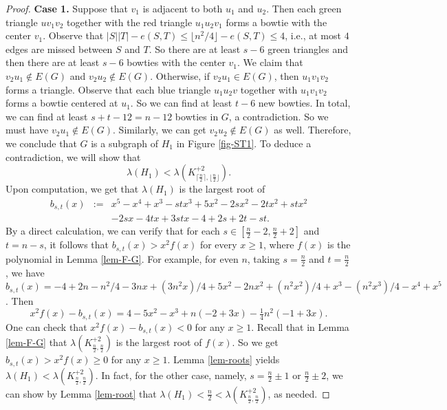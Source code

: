 \documentclass[11pt]{article}
\begin{document}
\begin{proof}
{\bf Case 1.} 
Suppose that 
$v_1$ is adjacent to both $u_1$ and $u_2$. 
Then each green triangle $uv_1v_2$ 
together with the red triangle $u_1u_2v_1$ 
forms a bowtie with the center $v_1$. 
Observe that $|S||T| - e(S,T) 
\le \lfloor n^2/4\rfloor - e(S,T)\le 4$, i.e., 
 at most $4$ edges are missed between 
$S$ and $T$. 
So there are at least $s-6$ green triangles and 
then there are at least $s-6$ bowties with the center 
$v_1$. 
We claim that $v_2u_1\notin E(G)$ and 
$v_2u_2\notin E(G)$. 
Otherwise, if $v_2u_1\in E(G)$, then 
$u_1v_1v_2$ forms a triangle. 
Observe that 
each blue triangle $u_1u_2v$ together with 
$u_1v_1v_2$ forms a bowtie centered at $u_1$. 
So we can find at least $t-6$ new bowties. 
 In total, we can find at least $s+t-12=n-12$ 
 bowties in $G$, a contradiction. So we must have 
 $v_2u_1\notin E(G)$. Similarly, we can get 
 $v_2u_2\notin E(G)$ as well.  
 Therefore, we conclude that 
 $G$ is a subgraph of $H_1$ in Figure \ref{fig-ST1}. 
 To deduce a contradiction, we will show that 
 \[ \lambda (H_1) 
 < \lambda (K_{\lceil \frac{n}{2} \rceil,\lfloor \frac{n}{2} \rfloor}^{+2}). \] 
  Upon computation, 
 we get that $\lambda (H_1)$ is the largest root of
 \begin{eqnarray*}
  b_{s,t}(x)&:=& x^5 - x^4 + x^3 - s t x^3 + 5 x^2 - 2 s x^2 -  2 t x^2 + s t x^2 \\
  & & 
 - 2 s x - 4 t x + 3 s t x -4 + 2 s + 2 t - s t .  
 \end{eqnarray*}
 By a direct calculation, we can verify that for 
 each $s\in [\frac{n}{2} -2, \frac{n}{2} +2]$ and $t=n-s$,  it follows that $b_{s,t}(x) > x^2f(x)$ for every 
 $x\ge 1$, 
 where $f(x)$ is the polynomial 
 in Lemma \ref{lem-F-G}. 
 For example, for even $n$, taking $s=\frac{n}{2}$ and $t=\frac{n}{2}$, we have $b_{s,t}(x)=-4 + 2 n - n^2/4 - 3 n x + (3 n^2 x)/4 + 5 x^2 - 2 n x^2 + (
 n^2 x^2)/4 + x^3 - (n^2 x^3)/4 - x^4 + x^5$. 
Then 
 \[  x^2f(x) - b_{s,t}(x) = 4 - 5 x^2 - x^3 + n (-2 + 3 x) - \tfrac{1}{4} n^2 (-1 + 3 x). \] 
 One can check that $x^2f(x) - b_{s,t}(x) < 0$ 
 for any $x\ge 1$. 
 Recall that in Lemma \ref{lem-F-G} that 
 $\lambda (K_{ \frac{n}{2},\frac{n}{2}}^{+2})$ is the largest root of $f(x)$. 
 So we get $b_{s,t}(x) > 
x^2f(x)\ge 0$ 
 for any $x\ge 1$. 
Lemma \ref{lem-roots} yields $\lambda (H_1) < 
 \lambda (K_{ \frac{n}{2},\frac{n}{2}}^{+2})$. 
 In fact, for the other case, namely, $s=\frac{n}{2}\pm 1$ or $\frac{n}{2}\pm 2$, we can show by Lemma \ref{lem-root}  that $\lambda (H_1)< \frac{n}{2} < \lambda (K_{ \frac{n}{2},\frac{n}{2}}^{+2})$, as needed. 
 

\end{proof}
\end{document}
